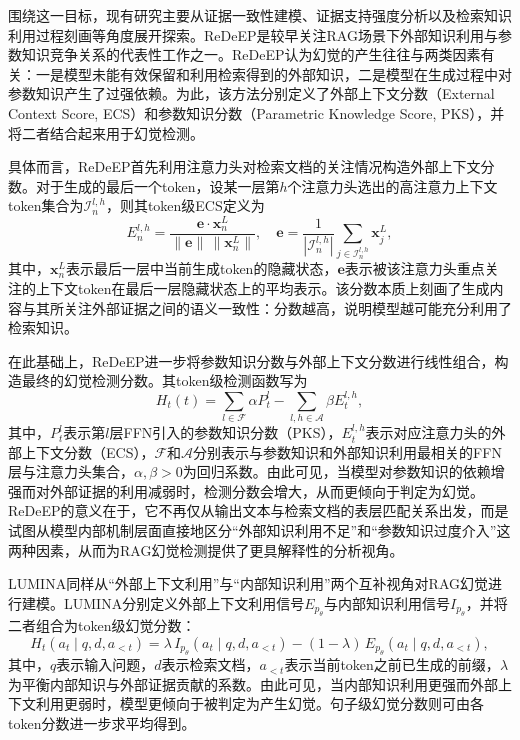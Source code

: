 围绕这一目标，现有研究主要从证据一致性建模、证据支持强度分析以及检索知识利用过程刻画等角度展开探索。ReDeEP\cite{sun2025redeep}是较早关注RAG场景下外部知识利用与参数知识竞争关系的代表性工作之一。ReDeEP认为幻觉的产生往往与两类因素有关：一是模型未能有效保留和利用检索得到的外部知识，二是模型在生成过程中对参数知识产生了过强依赖。为此，该方法分别定义了外部上下文分数（External Context Score, ECS）和参数知识分数（Parametric Knowledge Score, PKS），并将二者结合起来用于幻觉检测。

具体而言，ReDeEP首先利用注意力头对检索文档的关注情况构造外部上下文分数。对于生成的最后一个token，设某一层第$h$个注意力头选出的高注意力上下文token集合为$\mathcal{I}_n^{l,h}$，则其token级ECS定义为
\begin{equation}
E_n^{l,h}=\frac{\mathbf{e}\cdot \mathbf{x}_n^L}{\|\mathbf{e}\|\,\|\mathbf{x}_n^L\|},\quad
\mathbf{e}=\frac{1}{|\mathcal{I}_n^{l,h}|}\sum_{j\in \mathcal{I}_n^{l,h}}\mathbf{x}_j^L,
\end{equation}
其中，$\mathbf{x}_n^L$表示最后一层中当前生成token的隐藏状态，$\mathbf{e}$表示被该注意力头重点关注的上下文token在最后一层隐藏状态上的平均表示。该分数本质上刻画了生成内容与其所关注外部证据之间的语义一致性：分数越高，说明模型越可能充分利用了检索知识。

在此基础上，ReDeEP进一步将参数知识分数与外部上下文分数进行线性组合，构造最终的幻觉检测分数。其token级检测函数写为
\begin{equation}
H_t(t)=\sum_{l\in \mathcal{F}}\alpha P_t^l-\sum_{l,h\in \mathcal{A}}\beta E_t^{l,h},
\end{equation}
其中，$P_t^l$表示第$l$层FFN引入的参数知识分数（PKS），$E_t^{l,h}$表示对应注意力头的外部上下文分数（ECS），$\mathcal{F}$和$\mathcal{A}$分别表示与参数知识和外部知识利用最相关的FFN层与注意力头集合，$\alpha,\beta>0$为回归系数。由此可见，当模型对参数知识的依赖增强而对外部证据的利用减弱时，检测分数会增大，从而更倾向于判定为幻觉。ReDeEP的意义在于，它不再仅从输出文本与检索文档的表层匹配关系出发，而是试图从模型内部机制层面直接地区分“外部知识利用不足”和“参数知识过度介入”这两种因素，从而为RAG幻觉检测提供了更具解释性的分析视角。

LUMINA\cite{yeh2025lumina}同样从“外部上下文利用”与“内部知识利用”两个互补视角对RAG幻觉进行建模。LUMINA分别定义外部上下文利用信号$E_{p_\theta}$与内部知识利用信号$I_{p_\theta}$，并将二者组合为token级幻觉分数：
\begin{equation}
H_t(a_t \mid q,d,a_{<t})
=
\lambda \, I_{p_\theta}(a_t \mid q,d,a_{<t})
-
(1-\lambda)\, E_{p_\theta}(a_t \mid q,d,a_{<t}),
\end{equation}
其中，$q$表示输入问题，$d$表示检索文档，$a_{<t}$表示当前token之前已生成的前缀，$\lambda$为平衡内部知识与外部证据贡献的系数。由此可见，当内部知识利用更强而外部上下文利用更弱时，模型更倾向于被判定为产生幻觉。句子级幻觉分数则可由各token分数进一步求平均得到。

